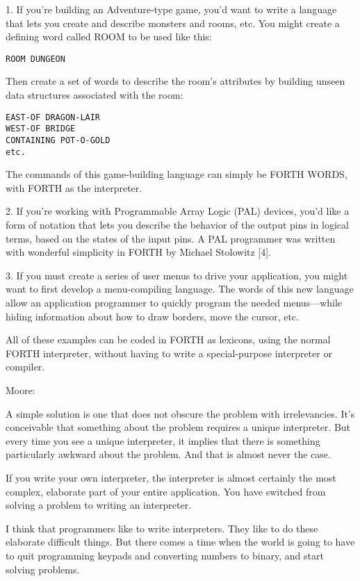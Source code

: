 1. If you're building an Adventure-type game, you'd want to write a language
that lets you create and describe monsters and rooms, etc. You might
create a defining word called ROOM to be used like this:

\begin{verbatim}
ROOM DUNGEON
\end{verbatim}

Then create a set of words to describe the room's attributes by building
unseen data structures associated with the room:

\begin{verbatim}
EAST-OF DRAGON-LAIR
WEST-OF BRIDGE
CONTAINING POT-O-GOLD
etc.
\end{verbatim}

The commands of this game-building language can simply be FORTH
WORDS, with FORTH as the interpreter.

2. If you're working with Programmable Array Logic (PAL) devices, you'd
like a form of notation that lets you describe the behavior of the output pins
in logical terms, based on the states of the input pins. A PAL programmer
was written with wonderful simplicity in FORTH by Michael Stolowitz [4].

3. If you must create a series of user menus to drive your application, you
might want to first develop a menu-compiling language. The words of this
new language allow an application programmer to quickly program the
needed menus---while hiding information about how to draw borders, move
the cursor, etc.

All of these examples can be coded in FORTH as lexicons, using the normal
FORTH interpreter, without having to write a special-purpose interpreter
or compiler.

Moore:

A simple solution is one that does not obscure the problem with irrelevancies.
It's conceivable that something about the problem requires a unique
interpreter. But every time you see a unique interpreter, it implies that
there is something particularly awkward about the problem. And that is
almost never the case.

If you write your own interpreter, the interpreter is almost certainly the
most complex, elaborate part of your entire application. You have switched
from solving a problem to writing an interpreter.

I think that programmers like to write interpreters. They like to do these
elaborate difficult things. But there comes a time when the world is going
to have to quit programming keypads and converting numbers to binary,
and start solving problems.

